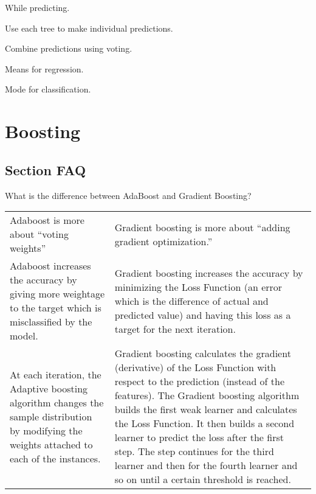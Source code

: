 While predicting.
	\begin{bulletedlist}
		\item Use each tree to make individual predictions.
		\item Combine predictions using voting.
		\begin{bulletedlist}
			\item Means for regression.
			\item Mode for classification.
		\end{bulletedlist}
	\end{bulletedlist}


	\section{Boosting}
	\subsection{Section FAQ}
	\resetquestioncounter{}
    \begin{qanda}
		\begin{question}
What is the difference between AdaBoost and Gradient Boosting?
		\end{question}
		\begin{answer}
			\begin{tabular}{|p{0.5\qandatextwidth-2.5\tabcolsep}|p{0.5\qandatextwidth-2.5\tabcolsep}|} \hline
					\tablecolumnheadervlinesone{AdaBoost} & \tablecolumnheadervlinestwo{Gradient Boosting} \\ \hline
					Adaboost is more about ``voting weights'' &
		            Gradient boosting is more about ``adding gradient optimization.'' \\ \hline
					Adaboost increases the accuracy by giving more weightage to the target which is misclassified by the model.	&
					Gradient boosting increases the accuracy by minimizing the Loss Function (an error which is the difference of actual and predicted value) and having this loss as a target for the next iteration. \\ \hline
					At each iteration, the Adaptive boosting algorithm changes the sample distribution by modifying the weights attached to each of the instances. &
					Gradient boosting calculates the gradient (derivative) of the Loss Function with respect to the prediction (instead of the features). \newline
					The Gradient boosting algorithm builds the first weak learner and calculates the Loss Function. \newline
					It then builds a second learner to predict the loss after the first step. The step continues for the third learner and then for the fourth learner and so on until a certain threshold is reached. \\ \hline%
				\end{tabular}
		\end{answer}
   \end{qanda}

